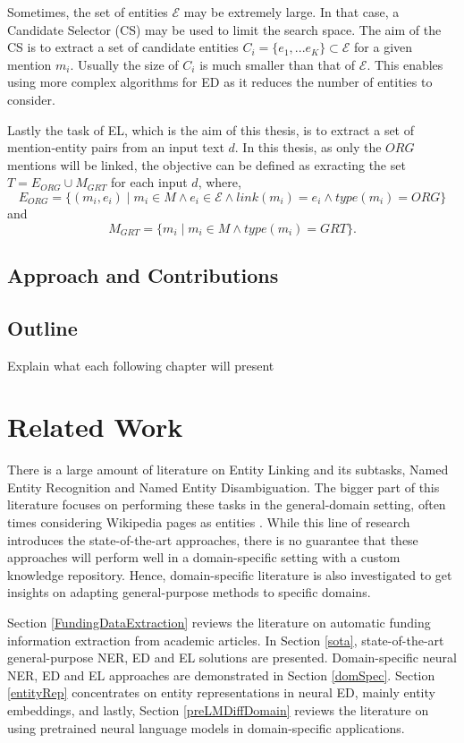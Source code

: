 \documentclass{report}
\theoremstyle{definition}
\theoremstyle{remark}
\begin{document}
Sometimes, the set of entities $\mathcal{E}$ may be extremely large. In that case, a Candidate Selector (CS) may be used to limit the search space. The aim of the CS is to extract a set of candidate entities $C_i = \{e_1,...e_K\} \subset \mathcal{E} $ for a given mention $m_i$. Usually the size of $C_i$ is much smaller than that of $\mathcal{E}$. This enables using more complex algorithms for ED as it reduces the number of entities to consider.

Lastly the task of EL, which is the aim of this thesis, is to extract a set of mention-entity pairs from an input text $d$. In this thesis, as only the $ORG$ mentions will be linked, the objective can be defined as exracting the set $T = E_{ORG} \cup M_{GRT}$ for each input $d$, where,
\begin{equation}
E_{ORG}=\{(m_i,e_i) \mid m_i \in M \land e_i \in \mathcal{E} \land link(m_i)=e_i \land type(m_i) = ORG\}
\end{equation}
and 
\begin{equation}
M_{GRT} = \{m_i \mid m_i \in M \land type(m_i) = GRT\}.
\end{equation}

\newpage
\section{Approach and Contributions}

\newpage
\section{Outline}
Explain what each following chapter will present

\newpage
\chapter{Related Work}
There is a large amount of literature on Entity Linking and its subtasks, Named Entity Recognition and Named Entity Disambiguation. The bigger part of this literature focuses on performing these tasks in the general-domain setting, often times considering Wikipedia pages as entities \cite{nlpnotes}. While this line of research introduces the state-of-the-art approaches, there is no guarantee that these approaches will perform well in a domain-specific setting with a custom knowledge repository. Hence, domain-specific literature is also investigated to get insights on adapting general-purpose methods to specific domains.

Section \ref{FundingDataExtraction} reviews the literature on automatic funding information extraction from academic articles. In Section \ref{sota}, state-of-the-art general-purpose NER, ED and EL solutions are presented. Domain-specific neural NER, ED and EL approaches are demonstrated in Section \ref{domSpec}. Section \ref{entityRep} concentrates on entity representations in neural ED, mainly entity embeddings, and lastly, Section \ref{preLMDiffDomain} reviews the literature on using pretrained neural language models in domain-specific applications.
\end{document}
